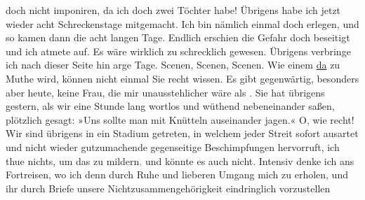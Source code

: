                doch nicht imponiren, da ich doch zwei Töchter habe! Übrigens habe ich jetzt wieder acht
               Schreckenstage mitgemacht. Ich bin nämlich einmal doch erlegen, und so kamen dann die
               acht langen Tage. Endlich erschien die Gefahr doch beseitigt und ich atmete auf. Es
               wäre wirklich zu schrecklich gewesen. Übrigens verbringe ich nach dieser Seite hin
               arge Tage. Scenen, Scenen, Scenen. Wie einem \uline{da} zu
               Muthe wird, können nicht einmal Sie recht wissen. Es gibt gegenwärtig, besonders aber
                  heute, keine Frau, die mir unausstehlicher wäre als
                  \label{K_L03159-4v}\label{K_L03159-4}. Sie hat übrigens gestern, als wir eine Stunde
               lang wortlos und wüthend nebeneinander saßen, plötzlich gesagt: »Uns sollte man mit
               Knütteln auseinander jagen.« O, wie recht! Wir sind übrigens in ein Stadium getreten,
               in welchem jeder Streit sofort ausartet und nicht wieder gutzumachende gegenseitige
               Beschimpfungen hervorruft, ich thue nichts, um das zu mildern\textcolor{gray}{,}{ }{\pb}und könnte es auch nicht.
               Intensiv denke ich ans Fortreisen, wo ich denn durch Ruhe und lieberen Umgang mich zu
               erholen, und ihr durch Briefe unsere Nichtzusammengehörigkeit eindringlich vorzustellen
